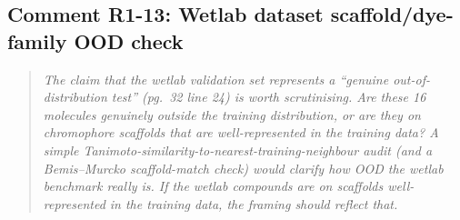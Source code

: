\documentclass[11pt]{article}
\newenvironment{reviewer}{%
  \begin{quote}\itshape\color{black!70}}{%
  \end{quote}}
\begin{document}
\subsection*{Comment R1-13: Wetlab dataset scaffold/dye-family OOD check}
\begin{reviewer}
The claim that the wetlab validation set represents a ``genuine out-of-distribution test'' (pg.\ 32 line 24) is worth scrutinising. Are these 16 molecules genuinely outside the training distribution, or are they on chromophore scaffolds that are well-represented in the training data? A simple Tanimoto-similarity-to-nearest-training-neighbour audit (and a Bemis--Murcko scaffold-match check) would clarify how OOD the wetlab benchmark really is. If the wetlab compounds are on scaffolds well-represented in the training data, the framing should reflect that.
\end{reviewer}
\end{document}
